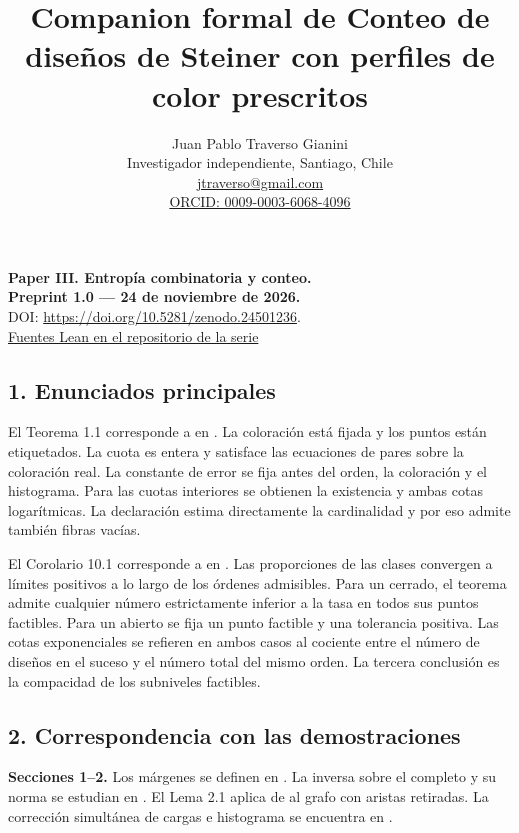 \documentclass[spanish,11pt,a4paper]{article}
\title{Companion formal de Conteo de diseños de Steiner con perfiles de color prescritos}
\author{Juan Pablo Traverso Gianini\\\small Investigador independiente, Santiago, Chile\\\small \href{mailto:jtraverso@gmail.com}{jtraverso@gmail.com}\\\small \href{https://orcid.org/0009-0003-6068-4096}{ORCID: 0009-0003-6068-4096}}\date{}
\begin{document}
\raggedbottom\maketitle
\begin{center}
\textbf{Paper III. Entropía combinatoria y conteo.}\\
\textbf{Preprint 1.0 --- 24 de noviembre de 2026.}\\
DOI: \url{https://doi.org/10.5281/zenodo.24501236}.\\
\href{https://github.com/jtraverso/latinon-entropy-ldp/tree/main/preprints/STEINER-PROFILES/05_formalization/lean}{Fuentes Lean en el repositorio de la serie}\end{center}
\subsection{1. Enunciados principales}\label{enunciados-principales}

El Teorema 1.1 corresponde a  en . La coloración está fijada y los puntos están etiquetados. La cuota es entera y satisface las ecuaciones de pares sobre la coloración real. La constante de error se fija antes del orden, la coloración y el histograma. Para las cuotas interiores se obtienen la existencia y ambas cotas logarítmicas. La declaración  estima directamente la cardinalidad y por eso admite también fibras vacías.

El Corolario 10.1 corresponde a  en . Las proporciones de las clases convergen a límites positivos a lo largo de los órdenes admisibles. Para un cerrado, el teorema admite cualquier número estrictamente inferior a la tasa en todos sus puntos factibles. Para un abierto se fija un punto factible y una tolerancia positiva. Las cotas exponenciales se refieren en ambos casos al cociente entre el número de diseños en el suceso y el número total del mismo orden. La tercera conclusión es la compacidad de los subniveles factibles.

\subsection{2. Correspondencia con las demostraciones}\label{correspondencia-con-las-demostraciones}

\textbf{Secciones 1--2.} Los márgenes se definen en . La inversa sobre el completo y su norma se estudian en . El Lema 2.1 aplica  de  al grafo con aristas retiradas. La corrección simultánea de cargas e histograma se encuentra en .
\end{document}
